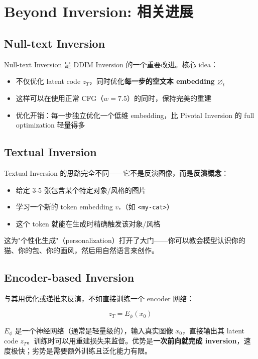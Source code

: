 \documentclass[11pt,a4paper]{article}
\theoremstyle{definition}
\begin{document}
\section{Beyond Inversion: 相关进展}

\subsection{Null-text Inversion}

Null-text Inversion 是 DDIM Inversion 的一个重要改进。核心 idea：

\begin{itemize}
    \item 不仅优化 latent code $z_T$，同时优化\textbf{每一步的空文本 embedding $\varnothing_t$}
    \item 这样可以在使用正常 CFG（$w=7.5$）的同时，保持完美的重建
    \item 优化开销：每一步独立优化一个低维 embedding，比 Pivotal Inversion 的 full optimization 轻量得多
\end{itemize}

\subsection{Textual Inversion}

Textual Inversion 的思路完全不同——它不是反演图像，而是\textbf{反演概念}：

\begin{itemize}
    \item 给定 3-5 张包含某个特定对象/风格的图片
    \item 学习一个新的 token embedding $v_*$（如 \texttt{<my-cat>}）
    \item 这个 token 就能在生成时精确触发该对象/风格
\end{itemize}

这为"个性化生成"（personalization）打开了大门——你可以教会模型认识你的猫、你的包、你的画风，然后用自然语言来创作。

\subsection{Encoder-based Inversion}

与其用优化或递推来反演，不如直接训练一个 encoder 网络：

\begin{equation}\label{eq:encoder}
    z_T = E_\phi(x_0)
\end{equation}

$E_\phi$ 是一个神经网络（通常是轻量级的），输入真实图像 $x_0$，直接输出其 latent code $z_T$。训练时可以用重建损失来监督。优势是\textbf{一次前向就完成 inversion}，速度极快；劣势是需要额外训练且泛化能力有限。
\end{document}
